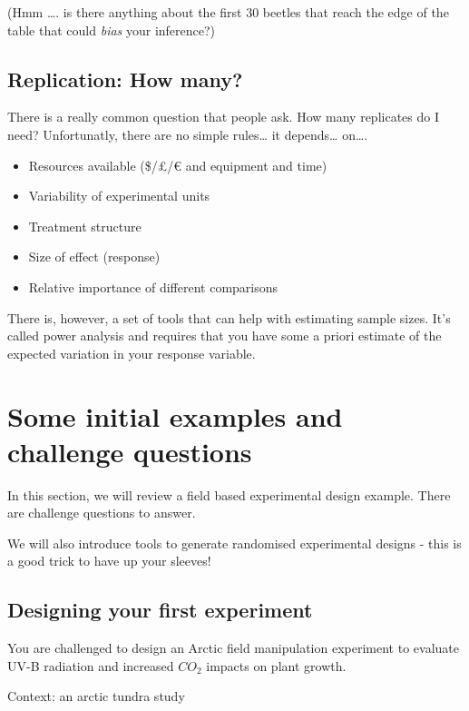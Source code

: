 \documentclass[
]{book}
\providecommand{\tightlist}{%
  \setlength{\itemsep}{0pt}\setlength{\parskip}{0pt}}
\begin{document}
(Hmm \ldots. is there anything about the first 30 beetles that reach the edge of the table that could \emph{bias} your inference?)

\section{Replication: How many?}\label{replication-how-many}

There is a really common question that people ask. How many replicates do I need? Unfortunatly, there are no simple rules\ldots{} it depends\ldots{} on\ldots.

\begin{itemize}
\tightlist
\item
  Resources available (\$/£/€ and equipment and time)
\item
  Variability of experimental units
\item
  Treatment structure
\item
  Size of effect (response)
\item
  Relative importance of different comparisons
\end{itemize}

There is, however, a set of tools that can help with estimating sample sizes. It's called power analysis and requires that you have some a priori estimate of the expected variation in your response variable.

\chapter{Some initial examples and challenge questions}\label{some-initial-examples-and-challenge-questions}

In this section, we will review a field based experimental design example. There are challenge questions to answer.

We will also introduce tools to generate randomised experimental designs - this is a good trick to have up your sleeves!

\section{Designing your first experiment}\label{designing-your-first-experiment}

You are challenged to design an Arctic field manipulation experiment to evaluate UV-B radiation and increased \(CO_{2}\) impacts on plant growth.

Context: an arctic tundra study
\end{document}
